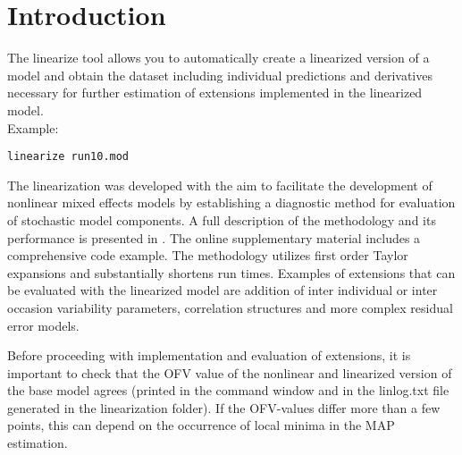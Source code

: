 




\maketitle
\newcommand{\guidetoolname}{linearize}


\section{Introduction}
The linearize tool allows you to automatically create a linearized version of a model and obtain the dataset including
individual predictions and derivatives necessary for further estimation of extensions implemented in the linearized model.\\ 
Example:
\begin{verbatim}
linearize run10.mod
\end{verbatim}

The linearization was developed with the aim to facilitate the development of nonlinear mixed effects models by establishing a diagnostic method for evaluation of stochastic model components. A full description of the methodology and its performance 
is presented in \cite{Svensson}. The online supplementary material includes a comprehensive code example. 
The methodology utilizes first order Taylor expansions and substantially shortens run times. Examples of extensions that can be evaluated with the linearized model are addition of inter individual or inter occasion variability parameters, correlation structures and more complex residual error models.

Before proceeding with implementation and evaluation of extensions, it is important to check that the OFV value of the nonlinear and linearized version of the base model agrees (printed in the command window and in the linlog.txt file generated in the linearization folder). If the OFV-values differ more than a few points, this can depend on the occurrence 
of local minima in the MAP estimation. 

